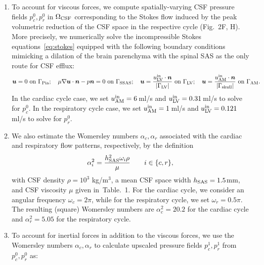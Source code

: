 \documentclass[fleqn,10pt]{wlscirep}
\begin{document}
\begin{enumerate}[label=\roman*)]
\item
  To account for viscous forces, we compute spatially-varying CSF
  pressure fields $p^0_c, p^0_r$ in $\Omega_{\rm CSF}$ corresponding
  to the Stokes flow induced by the peak volumetric reduction of the
  CSF space in the respective cycle (Fig.~2F, H). More
  precisely, we numerically solve the incompressible Stokes
  equations~\eqref{eq:stokes} equipped with the following boundary
  conditions mimicking a dilation of the brain parenchyma with the
  spinal SAS as the only route for CSF efflux:
  \begin{equation}\label{eq:pulsatility:bcs}
    \bm u = 0 \text{ on } \Gamma_{\rm Pia}; \quad 
    \mu \nabla \bm u \cdot \bm n - p \bm n = 0 \text{ on } \Gamma_{\rm SSAS}; \quad 
    \bm u = \frac{u^{\rm in}_{\rm LV} \cdot \bm n}{|\Gamma_{\rm LV}|} \text{ on } \Gamma_{\rm LV}; \quad
    \bm u = \frac{u^{\rm in}_{\rm AM} \cdot \bm n}{|\Gamma_{\rm skull}|} \text{ on } \Gamma_{\rm AM}.
\end{equation}
  In the cardiac cycle case, we set $u^{\rm in}_{\rm AM} = 6\,$ml/s \cite{causemann2022human,baledent2014imaging} and $u^{\rm in}_{\rm LV}=0.31\,$ml/s \cite{vinje2019respiratory} to solve for $p^0_c$. In the respiratory cycle case, we set $u^{\rm{in}}_{\rm{AM}} = 1\,$ml/s \cite{gutierrez2022effect} and $u^{\rm in}_{\rm{LV}}=0.121\,$ml/s \cite{liu2024using} to solve for $p^0_r$.
\item
  We also estimate the Womersley numbers $\alpha_c, \alpha_r$
  associated with the cardiac and respiratory flow patterns,
  respectively, by the definition
  \begin{equation}
    \alpha^2_i = \frac{h_{\rm SAS}^2 \omega_i \rho}{\mu} \qquad i \in \{c, r\},
  \end{equation}
  with CSF density $\rho = 10^3$ kg/m$^3$, a mean CSF space width $h_{\rm SAS} =
  1.5$mm, and CSF viscosity $\mu$ given in~Table.~1.  For
  the cardiac cycle, we consider an angular frequency $\omega_c = 2
  \pi$, while for the respiratory cycle, we set $\omega_r = 0.5
  \pi$. The resulting (square) Womersley numbers are $\alpha_c^2 = 20.2$
  for the cardiac cycle and $\alpha_r^2 = 5.05$ for the respiratory
  cycle.
\item
  To account for inertial forces in addition to the viscous forces, we
  use the Womersley numbers $\alpha_c, \alpha_r$ to calculate upscaled
  pressure fields $p^1_c, p^1_r$ from $p^0_c, p^0_r$ as:
  \begin{equation}

\end{equation}
\end{enumerate}
\end{document}
